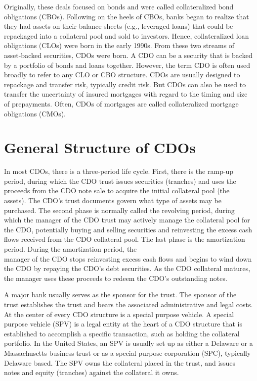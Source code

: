 \documentclass[11pt]{article}
\begin{document}
Originally, these deals focused on bonds and were called collateralized bond obligations (CBOs). Following on the heels of CBOs, banks began to realize that they had assets on their balance sheets (e.g., leveraged loans) that could be repackaged into a collateral pool and sold to investors. Hence, collateralized loan obligations (CLOs) were born in the early 1990s. From these two streams of asset-backed securities, CDOs were born. A CDO can be a security that is backed by a portfolio of bonds and loans together. However, the term CDO is often used broadly to refer to any CLO or CBO structure. CDOs are usually designed to repackage and transfer risk, typically credit risk. But CDOs can also be used to transfer the uncertainty of insured mortgages with regard to the timing and size of prepayments. Often, CDOs of mortgages are called collateralized mortgage obligations (CMOs).

\section*{General Structure of CDOs}
In most CDOs, there is a three-period life cycle. First, there is the ramp-up period, during which the CDO trust issues securities (tranches) and uses the proceeds from the CDO note sale to acquire the initial collateral pool (the assets). The CDO's trust documents govern what type of assets may be purchased. The second phase is normally called the revolving period, during which the manager of the CDO trust may actively manage the collateral pool for the CDO, potentially buying and selling securities and reinvesting the excess cash flows received from the CDO collateral pool. The last phase is the amortization period. During the amortization period, the\\
manager of the CDO stops reinvesting excess cash flows and begins to wind down the CDO by repaying the CDO's debt securities. As the CDO collateral matures, the manager uses these proceeds to redeem the CDO's outstanding notes.

A major bank usually serves as the sponsor for the trust. The sponsor of the trust establishes the trust and bears the associated administrative and legal costs. At the center of every CDO structure is a special purpose vehicle. A special purpose vehicle (SPV) is a legal entity at the heart of a CDO structure that is established to accomplish a specific transaction, such as holding the collateral portfolio. In the United States, an SPV is usually set up as either a Delaware or a Massachusetts business trust or as a special purpose corporation (SPC), typically Delaware based. The SPV owns the collateral placed in the trust, and issues notes and equity (tranches) against the collateral it owns.
\end{document}

